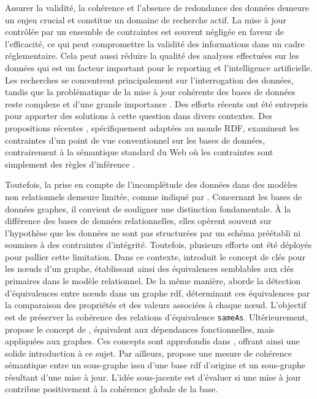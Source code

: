 Assurer la validité, la cohérence et l'absence de redondance des données demeure un enjeu crucial et constitue un domaine de recherche actif.
La mise à jour contrôlée par un ensemble de contraintes est souvent négligée en faveur de l'efficacité, ce qui peut compromettre la validité des informations dans un cadre réglementaire.
Cela peut aussi réduire la qualité des analyses effectuées sur les données qui est un facteur important pour le reporting et l'intelligence artificielle.
Les recherches se concentrent principalement sur l'interrogation des données, tandis que la problématique de la mise à jour cohérente des bases de données reste complexe et d'une grande importance \cite{halfeld-ferrariUpdateRulesDatalog1998,scheweLimitationsRuleTriggering1998,linkArithmeticTheoryConsistency2002}.
Des efforts récents ont été entrepris pour apporter des solutions à cette question dans divers contextes.
Des propositions récentes \cite{akhtarConstraintsRDF2011,flourisFormalFoundationsRDF2013,halfed-ferrariRDFUpdatesConstraints2017,halfeld-ferrariUpdatingRDFDatabases2017}, spécifiquement adaptées au monde RDF, examinent les contraintes d'un point de vue conventionnel sur les bases de données, contrairement à la sémantique standard du Web où les contraintes sont simplement des règles d'inférence \cite{lausenSPARQLingConstraintsRDF2008,gottlobOntologicalQueriesRewriting2011,patel-schneiderUsingDescriptionLogics2015}.

Toutefois, la prise en compte de l'incomplétude des données dans des modèles non relationnels demeure limitée, comme indiqué par \cite{sirangeloRepresentingQueryingIncomplete2014}.
Concernant les bases de données graphes, il convient de souligner une distinction fondamentale.
À la différence des bases de données relationnelles, elles opèrent souvent sur l'hypothèse que les données ne sont pas structurées par un schéma préétabli ni soumises à des contraintes d'intégrité.
Toutefois, plusieurs efforts ont été déployés pour pallier cette limitation.
Dans ce contexte, \cite{fanKeysGraphs2015} introduit le concept de clés pour les nœuds d'un graphe, établissant ainsi des équivalences semblables aux clés primaires dans le modèle relationnel.
De la même manière, \cite{raadDetectionLiensIdentite2018} aborde la détection d'équivalences entre nœuds dans un graphe \gls{rdf}, déterminant ces équivalences par la comparaison des propriétés et des valeurs associées à chaque nœud.
L'objectif est de préserver la cohérence des relations d'équivalence \verb|sameAs|.
Ultérieurement, \cite{fanDependenciesGraphs2019} propose le concept de , équivalent aux dépendances fonctionnelles, mais appliquées aux graphes.
Ces concepts sont approfondis dans \cite{anglesPgkeysKeysProperty2021,bonifatiQueryingGraphs2018}, offrant ainsi une solide introduction à ce sujet.
Par ailleurs, \cite{maillotConsistencyEvaluationRDF2014} propose une mesure de cohérence sémantique entre un sous-graphe issu d'une base \gls{rdf} d'origine et un sous-graphe résultant d'une mise à jour.
L'idée sous-jacente est d'évaluer si une mise à jour contribue positivement à la cohérence globale de la base.

